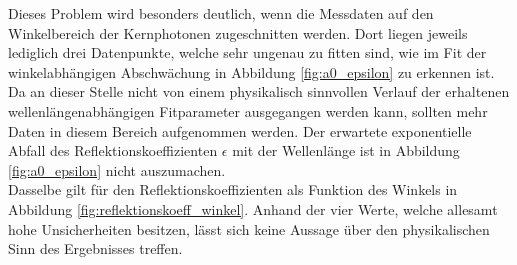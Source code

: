 Dieses Problem wird besonders deutlich, wenn die Messdaten auf den Winkelbereich der Kernphotonen zugeschnitten werden. Dort liegen jeweils lediglich drei Datenpunkte, welche sehr ungenau zu fitten sind, wie im Fit der winkelabhängigen Abschwächung in Abbildung \ref{fig:a0_epsilon} zu erkennen ist. Da an dieser Stelle nicht von einem physikalisch sinnvollen Verlauf der erhaltenen wellenlängenabhängigen Fitparameter ausgegangen werden kann, sollten mehr Daten in diesem Bereich aufgenommen werden. Der erwartete exponentielle Abfall des Reflektionskoeffizienten $\epsilon$ mit der Wellenlänge ist in Abbildung \ref{fig:a0_epsilon} nicht auszumachen.\\

Dasselbe gilt für den Reflektionskoeffizienten als Funktion des Winkels in Abbildung \ref{fig:reflektionskoeff_winkel}. Anhand der vier Werte, welche allesamt hohe Unsicherheiten besitzen, lässt sich keine Aussage über den physikalischen Sinn des Ergebnisses treffen.

